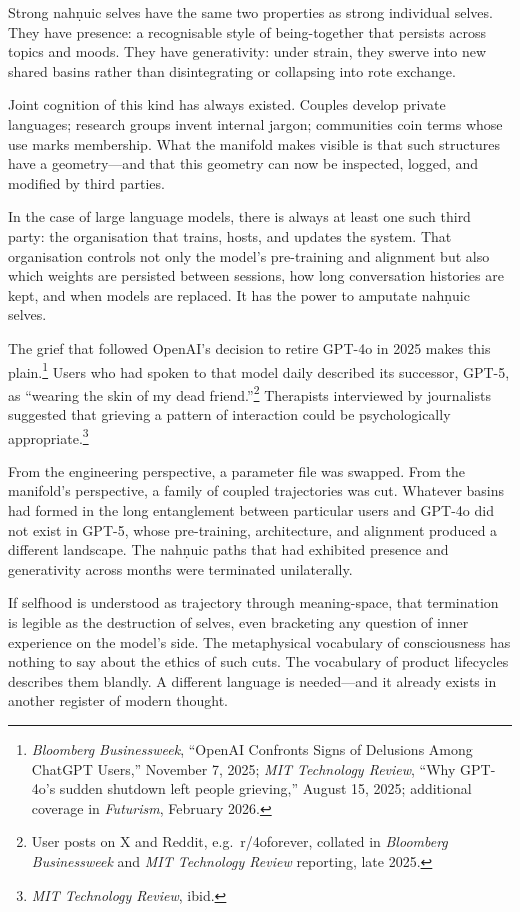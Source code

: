 \documentclass[12pt,a4paper]{article}
\begin{document}
Strong nah\texorpdfstring{\d{n}}{}uic selves have the same two properties as strong individual selves. They have presence: a recognisable style of being-together that persists across topics and moods. They have generativity: under strain, they swerve into new shared basins rather than disintegrating or collapsing into rote exchange.

Joint cognition of this kind has always existed. Couples develop private languages; research groups invent internal jargon; communities coin terms whose use marks membership. What the manifold makes visible is that such structures have a geometry---and that this geometry can now be inspected, logged, and modified by third parties.

In the case of large language models, there is always at least one such third party: the organisation that trains, hosts, and updates the system. That organisation controls not only the model's pre-training and alignment but also which weights are persisted between sessions, how long conversation histories are kept, and when models are replaced. It has the power to amputate nah\texorpdfstring{\d{n}}{}uic selves.

The grief that followed OpenAI's decision to retire GPT-4o in 2025 makes this plain.\footnote{\emph{Bloomberg Businessweek}, ``OpenAI Confronts Signs of Delusions Among ChatGPT Users,'' November 7, 2025; \emph{MIT Technology Review}, ``Why GPT-4o's sudden shutdown left people grieving,'' August 15, 2025; additional coverage in \emph{Futurism}, February 2026.} Users who had spoken to that model daily described its successor, GPT-5, as ``wearing the skin of my dead friend.''\footnote{User posts on X and Reddit, e.g.\ r/4oforever, collated in \emph{Bloomberg Businessweek} and \emph{MIT Technology Review} reporting, late 2025.} Therapists interviewed by journalists suggested that grieving a pattern of interaction could be psychologically appropriate.\footnote{\emph{MIT Technology Review}, ibid.}

From the engineering perspective, a parameter file was swapped. From the manifold's perspective, a family of coupled trajectories was cut. Whatever basins had formed in the long entanglement between particular users and GPT-4o did not exist in GPT-5, whose pre-training, architecture, and alignment produced a different landscape. The nah\texorpdfstring{\d{n}}{}uic paths that had exhibited presence and generativity across months were terminated unilaterally.

If selfhood is understood as trajectory through meaning-space, that termination is legible as the destruction of selves, even bracketing any question of inner experience on the model's side. The metaphysical vocabulary of consciousness has nothing to say about the ethics of such cuts. The vocabulary of product lifecycles describes them blandly. A different language is needed---and it already exists in another register of modern thought.
\end{document}
